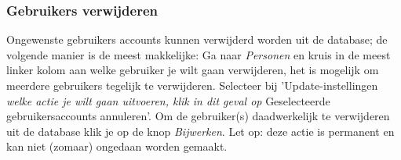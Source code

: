 \subsubsection{Gebruikers verwijderen}

Ongewenste gebruikers accounts kunnen verwijderd worden uit de database; de volgende manier is de meest makkelijke:
Ga naar \emph{Personen} en kruis in de meest linker kolom aan welke gebruiker je wilt gaan verwijderen, het is mogelijk om meerdere gebruikers tegelijk te verwijderen. Selecteer bij 'Update-instellingen\emph{ welke actie je wilt gaan uitvoeren, klik in dit geval op }Geselecteerde gebruikersaccounts annuleren'. Om de gebruiker(s) daadwerkelijk te verwijderen uit de database klik je op de knop \emph{Bijwerken}. Let op: deze actie is permanent en kan niet (zomaar) ongedaan worden gemaakt. 

